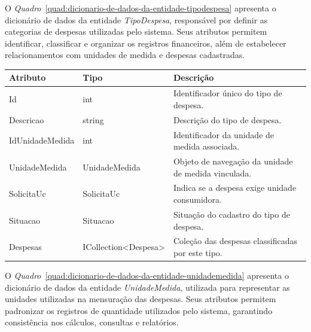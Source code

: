 O \textit{Quadro}~\ref{quad:dicionario-de-dados-da-entidade-tipodespesa} apresenta o dicionário de dados da entidade \textit{TipoDespesa}, responsável por definir as categorias de despesas utilizadas pelo sistema. Seus atributos permitem identificar, classificar e organizar os registros financeiros, além de estabelecer relacionamentos com unidades de medida e despesas cadastradas.

\begin{quadro}[H]
\caption[Dicionário de dados da entidade TipoDespesa]{Dicionário de dados da entidade TipoDespesa}
\label{quad:dicionario-de-dados-da-entidade-tipodespesa}

\begin{tabular}{|p{}|p{}|p{}|}
\hline
\textbf{Atributo} & \textbf{Tipo} & \textbf{Descrição} \\ 
\hline
Id & int & Identificador único do tipo de despesa. \\ 
\hline
Descricao & string & Descrição do tipo de despesa. \\ 
\hline
IdUnidadeMedida & int & Identificador da unidade de medida associada. \\ 
\hline
UnidadeMedida & UnidadeMedida & Objeto de navegação da unidade de medida vinculada. \\ 
\hline
SolicitaUc & SolicitaUc & Indica se a despesa exige unidade consumidora. \\ 
\hline
Situacao & Situacao & Situação do cadastro do tipo de despesa. \\ 
\hline
Despesas & ICollection<Despesa> & Coleção das despesas classificadas por este tipo. \\ 
\hline
\end{tabular}


\end{quadro}


O \textit{Quadro}~\ref{quad:dicionario-de-dados-da-entidade-unidademedida} apresenta o dicionário de dados da entidade \textit{UnidadeMedida}, utilizada para representar as unidades utilizadas na mensuração das despesas. Seus atributos permitem padronizar os registros de quantidade utilizados pelo sistema, garantindo consistência nos cálculos, consultas e relatórios.

